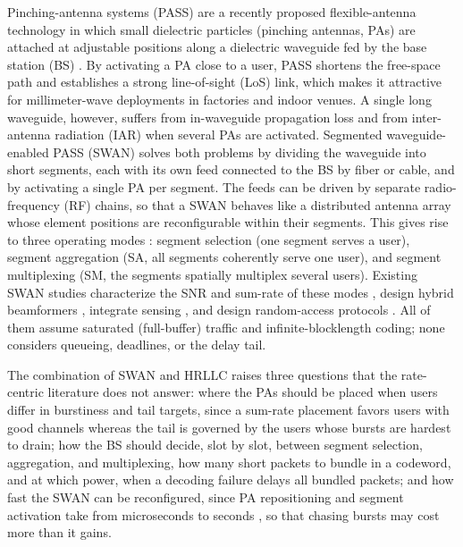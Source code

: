 \documentclass[journal]{IEEEtran}
\begin{document}
Pinching-antenna systems (PASS) are a recently proposed flexible-antenna technology in which small dielectric particles (pinching antennas, PAs) are attached at adjustable positions along a dielectric waveguide fed by the base station (BS) \cite{Ding2025FlexibleAntenna,Liu2026PASSTutorial,Liu2026PASSSurvey,Xu2025GeneralizedPASS}. By activating a PA close to a user, PASS shortens the free-space path and establishes a strong line-of-sight (LoS) link, which makes it attractive for millimeter-wave deployments in factories and indoor venues. A single long waveguide, however, suffers from in-waveguide propagation loss and from inter-antenna radiation (IAR) when several PAs are activated. Segmented waveguide-enabled PASS (SWAN) \cite{Ouyang2026SWAN} solves both problems by dividing the waveguide into short segments, each with its own feed connected to the BS by fiber or cable, and by activating a single PA per segment. The feeds can be driven by separate radio-frequency (RF) chains, so that a SWAN behaves like a distributed antenna array whose element positions are reconfigurable within their segments. This gives rise to three operating modes \cite{Ouyang2026SWAN,Shan2026SWANAccess}: segment selection (one segment serves a user), segment aggregation (SA, all segments coherently serve one user), and segment multiplexing (SM, the segments spatially multiplex several users). Existing SWAN studies characterize the SNR and sum-rate of these modes \cite{Ouyang2026SWAN,Gu2026SWANSumRate,Gu2026HSSA}, design hybrid beamformers \cite{Jiang2026SWANTriHybrid,Guo2026SWANGNN}, integrate sensing \cite{Jiang2025SWANISAC,Gao2026SWANISAC,Geng2026CRLBSWAN}, and design random-access protocols \cite{Shan2026SWANAccess}. All of them assume saturated (full-buffer) traffic and infinite-blocklength coding; none considers queueing, deadlines, or the delay tail.

The combination of SWAN and HRLLC raises three questions that the rate-centric literature does not answer: where the PAs should be placed when users differ in burstiness and tail targets, since a sum-rate placement favors users with good channels whereas the tail is governed by the users whose bursts are hardest to drain; how the BS should decide, slot by slot, between segment selection, aggregation, and multiplexing, how many short packets to bundle in a codeword, and at which power, when a decoding failure delays all bundled packets; and how fast the SWAN can be reconfigured, since PA repositioning and segment activation take from microseconds to seconds \cite{Liu2026PASSTutorial,Wang2026Roaming}, so that chasing bursts may cost more than it gains.
\end{document}
